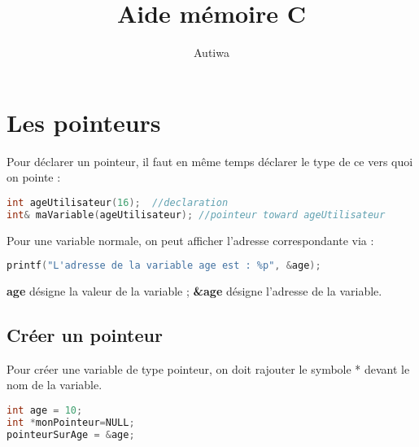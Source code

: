 \documentclass[a4paper,twoside]{article}
\title{Aide mémoire C}
\author{Autiwa}
\begin{document}
\tableofcontents

\clearpage


\section{Les pointeurs}\label{sec:pointeurs}
Pour déclarer un pointeur, il faut en même temps déclarer le type de ce vers quoi on pointe : 
\begin{lstlisting}[language=C++]
int ageUtilisateur(16);  //declaration
int& maVariable(ageUtilisateur); //pointeur toward ageUtilisateur
\end{lstlisting}

Pour une variable normale, on peut afficher l'adresse correspondante via :
\begin{lstlisting}[language=C]
printf("L'adresse de la variable age est : %p", &age);
\end{lstlisting}

\textbf{age} désigne la valeur de la variable ; \textbf{&age} désigne l'adresse de la variable.

\subsection{Créer un pointeur}

Pour créer une variable de type pointeur, on doit rajouter le symbole * devant le nom de la variable.
\begin{lstlisting}[language=C]
int age = 10;
int *monPointeur=NULL;
pointeurSurAge = &age;
\end{lstlisting}
\end{document}
